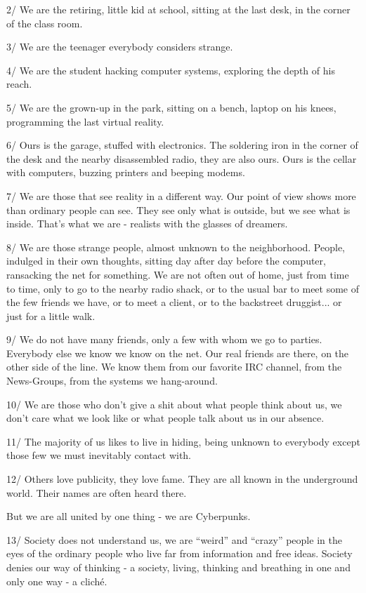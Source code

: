 \documentclass[letterpaper,12pt,english]{sphinxmanual}
\begin{document}
2/ We are the retiring, little kid at school, sitting at the last desk, in the corner of the class room.

3/ We are the teenager everybody considers strange.

4/ We are the student hacking computer systems, exploring the depth of his reach.

5/ We are the grown-up in the park, sitting on a bench, laptop on his knees, programming the last virtual reality.

6/ Ours is the garage, stuffed with electronics. The soldering iron in the corner of the desk and the nearby disassembled radio, they are also ours. Ours is the cellar with computers, buzzing printers and beeping modems.

7/ We are those that see reality in a different way. Our point of view shows more than ordinary people can see. They see only what is outside, but we see what is inside. That's what we are - realists with the glasses of dreamers.

8/ We are those strange people, almost unknown to the neighborhood. People, indulged in their own thoughts, sitting day after day before the computer, ransacking the net for something. We are not often out of home, just from time to time, only to go to the nearby radio shack, or to the usual bar to meet some of the few friends we have, or to meet a client, or to the backstreet druggist... or just for a little walk.

9/ We do not have many friends, only a few with whom we go to parties. Everybody else we know we know on the net. Our real friends are there, on the other side of the line. We know them from our favorite IRC channel, from the News-Groups, from the systems we hang-around.

10/ We are those who don't give a shit about what people think about us, we don't care what we look like or what people talk about us in our absence.

11/ The majority of us likes to live in hiding, being unknown to everybody except those few we must inevitably contact with.

12/ Others love publicity, they love fame. They are all known in the underground world. Their names are often heard there.

But we are all united by one thing - we are Cyberpunks.

13/ Society does not understand us, we are ``weird'' and ``crazy'' people in the eyes of the ordinary people who live far from information and free ideas. Society denies our way of thinking - a society, living, thinking and breathing in one and only one way - a cliché.
\end{document}
